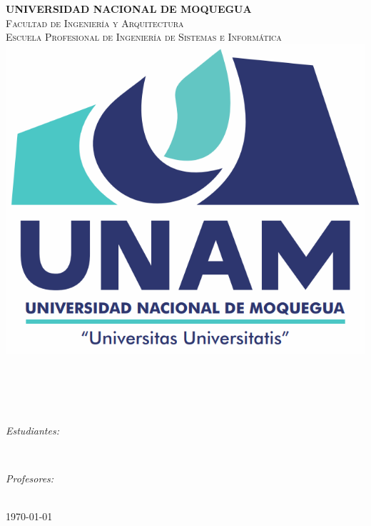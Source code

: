 \begin{titlepage}
\newcommand{\HRule}{\rule{\linewidth}{0.5mm}}
\centering

\textsc{\Large \textbf{UNIVERSIDAD NACIONAL DE MOQUEGUA}}\\[0.5cm]
\textsc{\Large Facultad de Ingeniería y Arquitectura }\\[0.5cm]
\textsc{\large Escuela Profesional de Ingeniería de Sistemas e Informática}\\[1.5cm]

\includegraphics[scale=.25]{img/image.png}\\[0.2cm] 


\noindent\hrulefill \\[0.5cm]
{ 
\Large{\bfseries{\reporttitle}}\\[0.5cm]
\large{\bfseries{\reportname}}
}\\[0.4cm]
\noindent\hrulefill \\[0.5cm]



\begin{minipage}[t]{0.4\textwidth}
\begin{flushleft} \large
\emph{Estudiantes:}\\
\studentname
\end{flushleft}
\end{minipage}
~
\begin{minipage}[t]{0.4\textwidth}
\begin{flushright} \large
\emph{Profesores:} \\
\teachername
\end{flushright}
\end{minipage}\\[2cm]

{\large \today}\\[2cm]



\vfill
\end{titlepage}
	